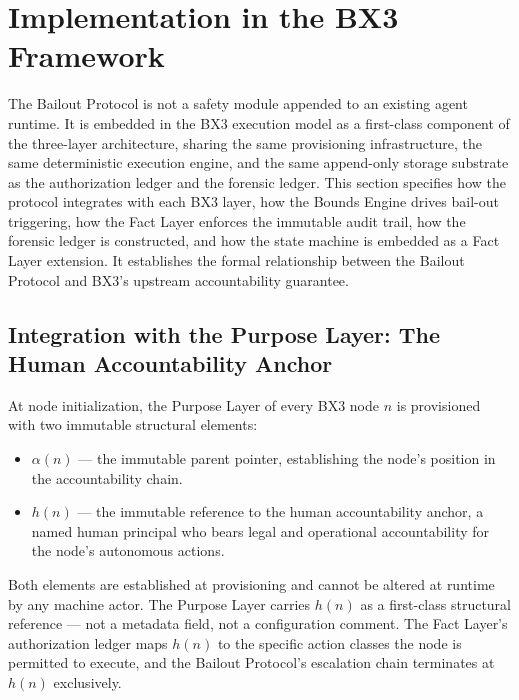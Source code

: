 \section{Implementation in the BX3 Framework}
\label{sec:implementation}

The Bailout Protocol is not a safety module appended to an existing agent runtime.
It is embedded in the BX3 execution model as a first-class component of the
three-layer architecture, sharing the same provisioning infrastructure, the same
deterministic execution engine, and the same append-only storage substrate as the
authorization ledger and the forensic ledger. This section specifies how the protocol
integrates with each BX3 layer, how the Bounds Engine drives bail-out triggering,
how the Fact Layer enforces the immutable audit trail, how the forensic ledger is
constructed, and how the state machine is embedded as a Fact Layer extension. It
establishes the formal relationship between the Bailout Protocol and BX3's upstream
accountability guarantee.

\subsection{Integration with the Purpose Layer: The Human Accountability Anchor}
\label{sec:purpose-layer}

At node initialization, the Purpose Layer of every BX3 node $n$ is provisioned with
two immutable structural elements:

\begin{itemize}
\item $\alpha(n)$ — the immutable parent pointer, establishing the node's position
  in the accountability chain.
\item $h(n)$ — the immutable reference to the human accountability anchor, a named
  human principal who bears legal and operational accountability for the node's
  autonomous actions.
\end{itemize}

Both elements are established at provisioning and cannot be altered at runtime by
any machine actor. The Purpose Layer carries $h(n)$ as a first-class structural
reference — not a metadata field, not a configuration comment. The Fact Layer's
authorization ledger maps $h(n)$ to the specific action classes the node is
permitted to execute, and the Bailout Protocol's escalation chain terminates at
$h(n)$ exclusively.

